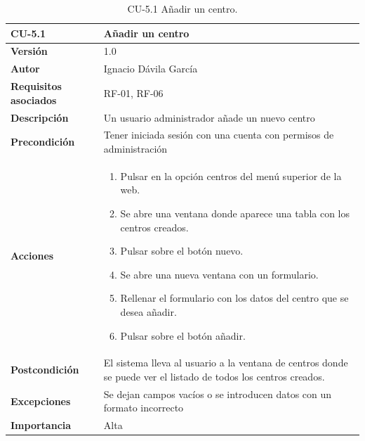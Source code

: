 \begin{table}[p]
	\centering
	\begin{tabularx}{\linewidth}{ p{} p{} }
		\toprule
		\textbf{CU-5.1}    & \textbf{Añadir un centro}\\
		\toprule
		\textbf{Versión}              & 1.0    \\
		\textbf{Autor}                & Ignacio Dávila García \\
		\textbf{Requisitos asociados} & RF-01, RF-06 \\
		\textbf{Descripción}          & Un usuario administrador añade un nuevo centro \\
		\textbf{Precondición}         & Tener iniciada sesión con una cuenta con permisos de administración \\
		\textbf{Acciones}             &
		\begin{enumerate}
			\def\labelenumi{\arabic{enumi}.}
			\tightlist
			\item Pulsar en la opción centros del menú superior de la web.
			\item Se abre una ventana donde aparece una tabla con los centros creados.
			\item Pulsar sobre el botón nuevo.
			\item Se abre una nueva ventana con un formulario.
			\item Rellenar el formulario con los datos del centro que se desea añadir.
			\item Pulsar sobre el botón añadir.
		\end{enumerate}\\
		\textbf{Postcondición}        & El sistema lleva al usuario a la ventana de centros donde se puede ver el listado de todos los centros creados. \\
		\textbf{Excepciones}          & Se dejan campos vacíos o se introducen datos con un formato incorrecto \\
		\textbf{Importancia}          & Alta \\
		\bottomrule
	\end{tabularx}
	\caption{CU-5.1 Añadir un centro.}
\end{table}

